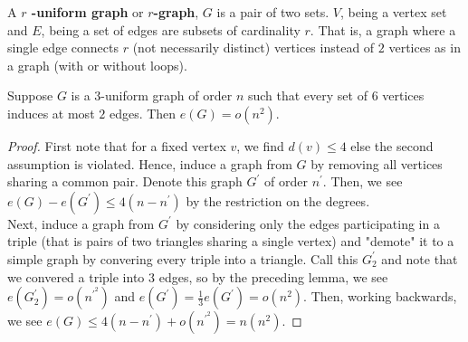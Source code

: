 \begin{definition}[Hypergraphs]
	A \textbf{\(r\) -uniform graph} or \textbf{\(r\)-graph}, \(G\) is a pair of two sets. \(V\), being a vertex set and \(E\), being a set of edges are subsets of cardinality \(r\). That is, a graph where a single edge connects \(r\) (not necessarily distinct) vertices instead of \(2\) vertices as in a graph (with or without loops).
\end{definition}
\begin{proposition}
	Suppose \(G\) is a \(3\)-uniform graph of order \(n\) such that every set of \(6\) vertices induces at most \(2\) edges. Then \(e\left( G \right)  = o\left( n^2 \right) \).
\end{proposition}
\begin{proof}
	First note that for  a fixed vertex \(v\), we find \(d \left( v \right) \le 4\) else the second assumption is violated. Hence, induce a graph from \(G\) by removing all vertices sharing a common pair. Denote this graph \(G^{\prime}\) of order \(n^{\prime}\). Then, we see \(e\left( G \right) - e\left( G^{\prime} \right) \le 4\left( n - n^{\prime} \right) \) by the restriction on the degrees. \\
	Next, induce a graph from \(G^{\prime}\) by considering only the edges participating in a triple (that is pairs of two triangles sharing a single vertex) and "demote" it to a simple graph by convering every triple into a triangle. Call this \(G^{\prime}_2\) and note that we convered a triple into \(3\) edges, so by the preceding lemma, we see \(e\left( G^{\prime}_{2} \right) = o\left( n^{\prime}^2 \right) \) and \(e\left( G^{\prime} \right) = \frac{1}{3}e\left( G^{\prime} \right)  = o\left( n^2 \right) \). Then, working backwards, we see \(e\left( G \right) \le 4\left( n - n^{\prime} \right)  + o\left( n^{\prime}^2 \right) = n\left( n^2 \right) \).
\end{proof}

